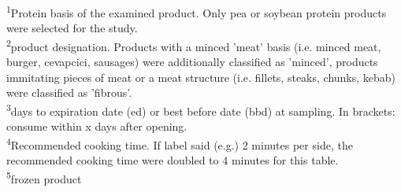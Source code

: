 \begin{minipage}{\linewidth}
\textsuperscript{1}Protein basis of the examined product. Only pea or soybean protein products were selected for the study.\\
\textsuperscript{2}product designation. Products with a minced 'meat' basis (i.e. minced meat, burger, cevapcici, sausages) were additionally classified as 'minced', products immitating pieces of meat or a meat structure (i.e. fillets, steaks, chunks, kebab) were classified as 'fibrous'.\\
\textsuperscript{3}days to expiration date (ed) or best before date (bbd) at sampling. In brackets: consume within x days after opening.\\
\textsuperscript{4}Recommended cooking time. If label said (e.g.) 2 minutes per side, the recommended cooking time were doubled to 4 minutes for this table. \\
\textsuperscript{5}frozen product\\
\end{minipage}


